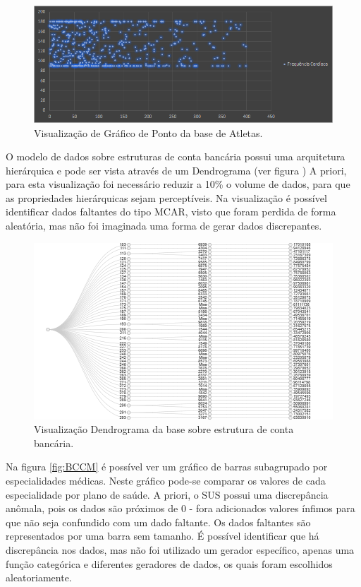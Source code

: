 \documentclass[
	12pt,				%
	openright,			%
	twoside,			%
	a4paper,			%
	english,			%
	brazil				%
	]{abntex2}
\begin{document}
	\begin{figure}[h!]
		\centering
		\includegraphics[width=\linewidth]{./figures/Resultados/Atletismo-Frequencia-Distancia.png}
		\caption{Visualização de Gráfico de Ponto da base de Atletas.}
		\label{fig:Atletismo-Frequencia-Distancia}
	\end{figure}

	O modelo de dados sobre estruturas de conta bancária possui uma arquitetura hierárquica e pode ser vista através de um Dendrograma (ver figura )
	A priori, para esta visualização foi necessário reduzir a 10\% o volume de dados, para que as propriedades hierárquicas sejam perceptíveis.
	Na visualização é possível identificar dados faltantes do tipo MCAR, visto que foram perdida de forma aleatória, mas não foi imaginada uma forma de gerar dados discrepantes.
	\par
	\begin{figure}[h!]
		\centering
		\includegraphics[width=\linewidth]{./figures/Resultados/BancoDendrograma.png}
		\caption{Visualização Dendrograma da base sobre estrutura de conta bancária.}
		\label{fig:BancoDendrograma}
	\end{figure}

	Na figura \ref{fig:BCCM} é possível ver um gráfico de barras subagrupado por especialidades médicas.
	Neste gráfico pode-se comparar os valores de cada especialidade por plano de saúde.
	A priori, o SUS possui uma discrepância anômala, pois os dados são próximos de 0 - fora adicionados valores ínfimos para que não seja confundido com um dado faltante.
	Os dados faltantes são representados por uma barra sem tamanho.
	É possível identificar que há discrepância nos dados, mas não foi utilizado um gerador específico, apenas uma função categórica e diferentes geradores de dados, os quais foram escolhidos aleatoriamente.
\end{document}
